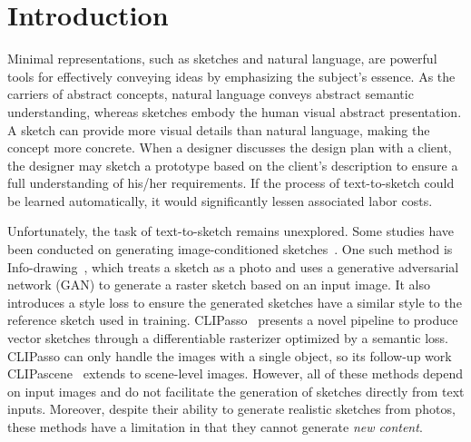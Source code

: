 \documentclass{article}
\begin{document}
\section{Introduction}
Minimal representations, such as sketches and natural language, are powerful tools for effectively conveying ideas by emphasizing the subject's essence. As the carriers of abstract concepts, natural language conveys abstract semantic understanding, whereas sketches embody the human visual abstract presentation. A sketch can provide more visual details than natural language, making the concept more concrete. %
When a designer discusses the design plan with a client, the designer may sketch a prototype based on the client's description to ensure a full understanding of his/her requirements. If the process of text-to-sketch could be learned automatically, it would significantly lessen associated labor costs.



Unfortunately, the task of text-to-sketch remains unexplored. Some studies have been conducted on generating image-conditioned sketches~\cite{infodrawing_Chan_2022,liu2020unsupervised,vinker_2022_clipasso,clipascene_vinker_2022}. One such method is Info-drawing~\cite{infodrawing_Chan_2022}, which treats a sketch as a photo and uses a generative adversarial network (GAN) to generate a raster sketch based on an input image. It also introduces a style loss to ensure the generated sketches have a similar style to the reference sketch used in training. CLIPasso~\cite{vinker_2022_clipasso} presents a novel pipeline to produce vector sketches through a differentiable rasterizer optimized by a semantic loss. CLIPasso can only handle the images with a single object, so its follow-up work CLIPascene~\cite{clipascene_vinker_2022} extends to scene-level images. However, all of these methods depend on input images and do not facilitate the generation of sketches directly from text inputs. 
Moreover, despite their ability to generate realistic sketches from photos, these methods have a limitation in that they cannot generate \textit{new content}.
\end{document}
